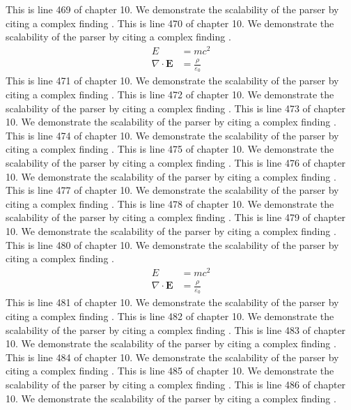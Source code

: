 This is line 469 of chapter 10. We demonstrate the scalability of the parser by citing a complex finding \cite{ref10_469}.
This is line 470 of chapter 10. We demonstrate the scalability of the parser by citing a complex finding \cite{ref10_470}.
\begin{align*}
  E &= mc^2 \\
  \nabla \cdot \mathbf{E} &= \frac{\rho}{\varepsilon_0}
\end{align*}
This is line 471 of chapter 10. We demonstrate the scalability of the parser by citing a complex finding \cite{ref10_471}.
This is line 472 of chapter 10. We demonstrate the scalability of the parser by citing a complex finding \cite{ref10_472}.
This is line 473 of chapter 10. We demonstrate the scalability of the parser by citing a complex finding \cite{ref10_473}.
This is line 474 of chapter 10. We demonstrate the scalability of the parser by citing a complex finding \cite{ref10_474}.
This is line 475 of chapter 10. We demonstrate the scalability of the parser by citing a complex finding \cite{ref10_475}.
This is line 476 of chapter 10. We demonstrate the scalability of the parser by citing a complex finding \cite{ref10_476}.
This is line 477 of chapter 10. We demonstrate the scalability of the parser by citing a complex finding \cite{ref10_477}.
This is line 478 of chapter 10. We demonstrate the scalability of the parser by citing a complex finding \cite{ref10_478}.
This is line 479 of chapter 10. We demonstrate the scalability of the parser by citing a complex finding \cite{ref10_479}.
This is line 480 of chapter 10. We demonstrate the scalability of the parser by citing a complex finding \cite{ref10_480}.
\begin{align*}
  E &= mc^2 \\
  \nabla \cdot \mathbf{E} &= \frac{\rho}{\varepsilon_0}
\end{align*}
This is line 481 of chapter 10. We demonstrate the scalability of the parser by citing a complex finding \cite{ref10_481}.
This is line 482 of chapter 10. We demonstrate the scalability of the parser by citing a complex finding \cite{ref10_482}.
This is line 483 of chapter 10. We demonstrate the scalability of the parser by citing a complex finding \cite{ref10_483}.
This is line 484 of chapter 10. We demonstrate the scalability of the parser by citing a complex finding \cite{ref10_484}.
This is line 485 of chapter 10. We demonstrate the scalability of the parser by citing a complex finding \cite{ref10_485}.
This is line 486 of chapter 10. We demonstrate the scalability of the parser by citing a complex finding \cite{ref10_486}.
